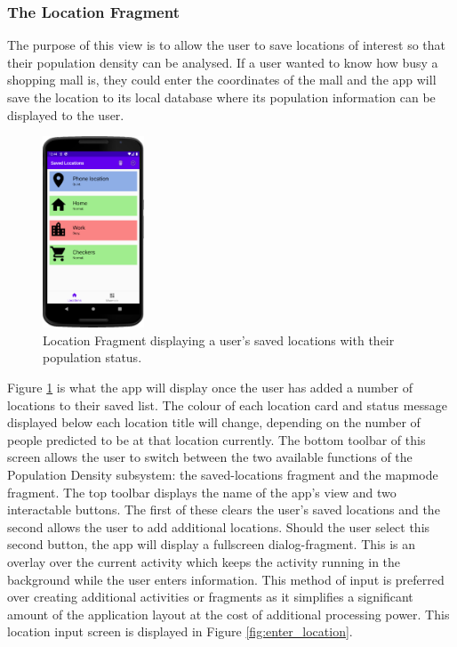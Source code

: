 \subsubsection{The Location Fragment}

The purpose of this view is to allow the user to save locations of interest so that their population density can be analysed. If a user wanted to know how busy a shopping mall is, they could enter the coordinates of the mall and the app will save the location to its local database where its population information can be displayed to the user. 

\begin{figure}[ht]
    \centering
    \includegraphics[width=0.268\textwidth]{figures/LocationFragmentDesign.PNG}
    \caption{Location Fragment displaying a user's saved locations with their population status.}
    \label{fig:location_fragment_design}
\end{figure}

Figure \ref{fig:location_fragment_design} is what the app will display once the user has added a number of locations to their saved list. The colour of each location card and status message displayed below each location title will change, depending on the number of people predicted to be at that location currently. The bottom toolbar of this screen allows the user to switch between the two available functions of the Population Density subsystem: the saved-locations fragment and the mapmode fragment. The top toolbar displays the name of the app's view and two interactable buttons. The first of these clears the user's saved locations and the second allows the user to add additional locations. Should the user select this second button, the app will display a fullscreen dialog-fragment. This is an overlay over the current activity which keeps the activity running in the background while the user enters information. This method of input is preferred over creating additional activities or fragments as it simplifies a significant amount of the application layout at the cost of additional processing power. This location input screen is displayed in Figure \ref{fig:enter_location}.

